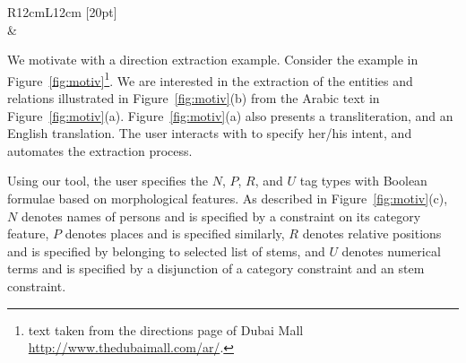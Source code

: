 \begin{figure*}[tb]
\begin{center}
{\begin{tabular}{R{12cm}L{12cm}}
     [20pt]{
     }\\
       & \\
    \end{tabular}
}
  \end{center}
  \caption{Text, formula, and match \framework example}
  \label{fig:motiv}
\end{figure*}
\transtrue
{}

We motivate \framework with a direction extraction example. 
Consider the example in Figure~\ref{fig:motiv}\footnote{text taken from the directions page of Dubai Mall \url{http://www.thedubaimall.com/ar/}.}.
We are interested in the extraction of the entities and relations illustrated in Figure~\ref{fig:motiv}(b)
from the Arabic text in Figure~\ref{fig:motiv}(a). Figure~\ref{fig:motiv}(a) 
also presents a transliteration, and an English translation. 
The user interacts with \framework to specify her/his intent, 
and \framework automates the extraction process.

Using our tool, the user specifies the $N$, $P$, $R$, and $U$ tag types with Boolean formulae based on morphological features.
As described in Figure~\ref{fig:motiv}(c), $N$ denotes names of persons and is specified by a constraint on its category feature,
$P$ denotes places and is specified similarly, $R$ denotes relative positions and is specified by belonging to selected list of 
stems, and $U$ denotes numerical terms and is specified by a disjunction of a category constraint and an stem constraint.

